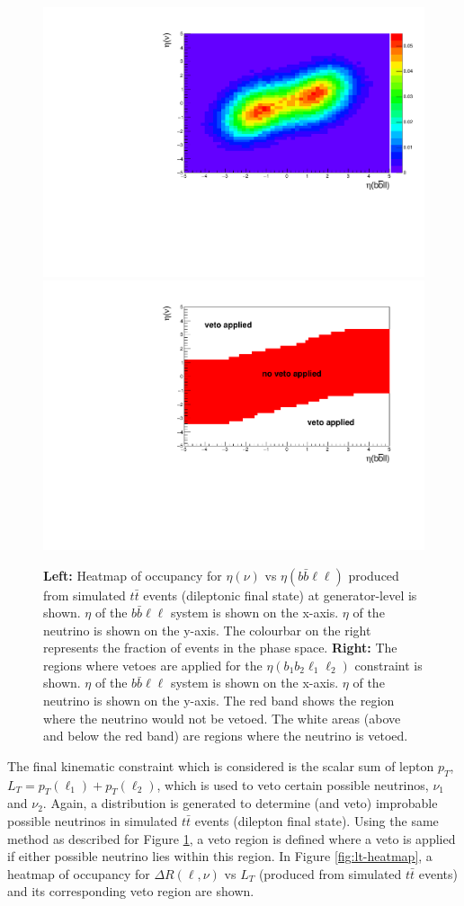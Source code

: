  \begin{figure}[h!]
	\includegraphics[width=0.45\linewidth]{figures/bbll_occ_2vSM.pdf}
		\includegraphics[width=0.45\linewidth]{figures/bbll_veto_2vSM.pdf}
	\centering
	\caption{\textbf{Left: }Heatmap of occupancy for $\eta (\nu)$ vs $\eta(b\bar{b}\ell\ell)$ produced from simulated $t\bar{t}$ events (dileptonic final state) at generator-level is shown. $\eta$ of the $b\bar{b}\ell\ell$ system is shown on the x-axis. $\eta$ of the neutrino is shown on the y-axis. The colourbar on the right represents the fraction of events in the phase space. \textbf{Right: } The regions where vetoes are applied for the $\eta(b_{1}b_{2}\ell_{1}\ell_{2})$ constraint is shown. $\eta$ of the $b\bar{b}\ell\ell$ system is shown on the x-axis. $\eta$ of the neutrino is shown on the y-axis. The red band shows the region where the neutrino would not be vetoed. The white areas (above and below the red band) are regions where the neutrino is vetoed.}
	\label{fig:eta-bbll-heatmap}
\end{figure}The final kinematic constraint which is considered is the scalar sum of lepton $p_{T}$, $L_{T} = p_{T}(\ell_{1}) + p_{T}(\ell_{2})$, which is used to veto certain possible neutrinos, $\nu_{1}$ and $\nu_{2}$. Again, a distribution is generated to determine (and veto) improbable possible neutrinos in simulated $t\bar{t}$ events (dilepton final state). Using the same method as described for Figure \ref{fig:eta-bbll-heatmap}, a veto region is defined where a veto is applied if either possible neutrino lies within this region. In Figure \ref{fig:lt-heatmap}, a heatmap of occupancy for $\Delta R (\ell, \nu)$ vs $L_{T}$ (produced from simulated $t\bar{t}$ events) and its corresponding veto region are shown.
